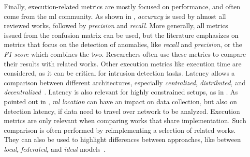 Finally, execution-related metrics are mostly focused on performance, and often come from the \gls{ml} community.
As shown in , \emph{accuracy} is used by almost all reviewed works, followed by \emph{precision} and \emph{recall}.
More generally, all metrics issued from the confusion matrix can be used, but the literature emphasizes on metrics that focus on the detection of anomalies, like \emph{recall} and \emph{precision}, or the \emph{F1-score} which combines the two.
Researchers often use these metrics to compare their results with related works.
Other execution metrics like execution time are considered, as it can be critical for intrusion detection tasks.
Latency allows a comparison between different architectures, especially \emph{centralized}, \emph{distributed}, and \emph{decentralized}~\cite{rathore_BlockSecIoTNetBlockchainbaseddecentralized_2019}.
Latency is also relevant for highly constrained setups, as in \cite{qin_LineSpeedScalableIntrusion_2020a}.
As pointed out in , \emph{\gls{ml} location} can have an impact on data collection, but also on detection latency, if data need to travel over network to be analyzed.
Execution metrics are only relevant when comparing works that share implementation.
Such comparison is often performed by reimplementing a selection of related works.
They can also be used to highlight differences between approaches, like between \emph{local}, \emph{federated}, and \emph{ideal} models~\cite{li_DeepFedFederatedDeep_2020,rathore_BlockSecIoTNetBlockchainbaseddecentralized_2019}.